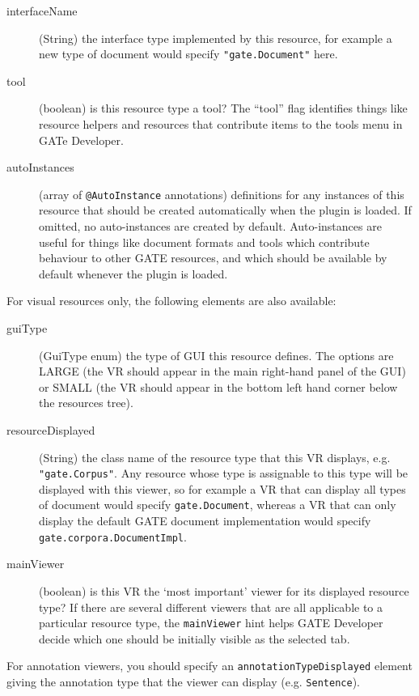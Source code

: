 \begin{description}
\item[interfaceName] (String) the interface type implemented by this resource,
  for example a new type of document would specify \verb|"gate.Document"| here.
\item[tool] (boolean) is this resource type a tool?  The ``tool'' flag
  identifies things like resource helpers and resources that contribute items
  to the tools menu in GATe Developer.
\item[autoInstances] (array of {\tt @AutoInstance} annotations) definitions for
  any instances of this resource that should be created automatically when the
  plugin is loaded.  If omitted, no auto-instances are created by default.
  Auto-instances are useful for things like document formats and tools which
  contribute behaviour to other GATE resources, and which should be available
  by default whenever the plugin is loaded.
\end{description}

For visual resources only, the following elements are also available:
\begin{description}
\item[guiType] (GuiType enum) the type of GUI this resource defines.
  The options are LARGE (the VR should appear in the main right-hand panel of
  the GUI) or SMALL (the VR should appear in the bottom left hand corner
  below the resources tree).
\item[resourceDisplayed] (String) the class name of the resource type that this
  VR displays, e.g. \verb|"gate.Corpus"|. Any resource whose type is assignable
  to this type will be displayed with this viewer, so for example a VR that can
  display all types of document would specify \verb|gate.Document|, whereas a
  VR that can only display the default GATE document implementation would
  specify \verb|gate.corpora.DocumentImpl|.
\item[mainViewer] (boolean) is this VR the `most important' viewer for its
  displayed resource type? If there are several different viewers that are all
  applicable to a particular resource type, the {\tt mainViewer} hint helps
  GATE Developer decide which one should be initially visible as the selected
  tab.
\end{description}

For annotation viewers, you should specify an
\verb|annotationTypeDisplayed| element giving the annotation type that the
viewer can display (e.g. {\tt Sentence}).


